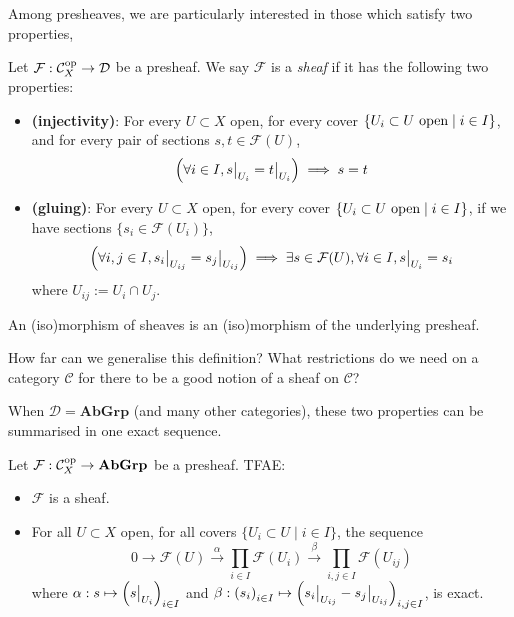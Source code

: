 \documentclass[000-main.tex]{subfiles}
\begin{document}
Among presheaves, we are particularly interested in those which satisfy two properties,
\begin{definition}
  Let $\mathcal{F}: \mathcal{C}_X^{\text{op}}\to \mathcal{D}$ be a presheaf.
  We say $\mathcal{F}$ is a \emph{sheaf} if it has the following two properties:
  \begin{itemize}
    \item \textbf{(injectivity)}: For every $U\subset X$ open, for every cover $\{U_i\subset U\text{ open} \mid i\in I\}$, and for every pair of sections $s, t\in \mathcal{F}(U)$,
          \begin{displaymath}
            \qty(\forall i\in I, {s}{\big|}_{U_i} = {t}{\big|}_{U_i}) \implies s = t
          \end{displaymath}
    \item \textbf{(gluing)}: For every $U\subset X$ open, for every cover $\{U_i\subset U\text{ open}\mid i\in I\}$, if we have sections $\{s_i\in \mathcal{F}(U_i)\}$,
          \begin{displaymath}
            \qty(\forall i, j \in I, {s_i}{\big|}_{U_{ij}} = {s_j}{\big|}_{U_{ij}}) \implies \exists s\in \mathcal{F}(U), \forall i\in I, {s}{\big|}_{U_i} = s_i
          \end{displaymath}
          where $U_{ij} := U_i\cap U_j$.
  \end{itemize}

  An (iso)morphism of sheaves is an (iso)morphism of the underlying presheaf.
\end{definition}
\begin{remark}
  How far can we generalise this definition?
  What restrictions do we need on a category $\mathcal{C}$ for there to be a good notion of a sheaf on $\mathcal{C}$?
\end{remark}

When $\mathcal{D} = \mathbf{AbGrp}$ (and many other categories), these two properties can be summarised in one exact sequence.
\begin{proposition}
  Let $\mathcal{F}: \mathcal{C}_X^{\text{op}} \to \mathbf{AbGrp}$ be a presheaf. TFAE:\@
  \begin{itemize}
    \item $\mathcal{F}$ is a sheaf.
    \item For all $U\subset X$ open, for all covers $\{U_i\subset U\mid i\in I\}$, the sequence
          \begin{displaymath}
            0 \to \mathcal{F}(U) \xrightarrow{\alpha} \prod_{i\in I}\mathcal{F}(U_i) \xrightarrow{\beta} \prod_{i, j\in I}\mathcal{F}(U_{ij})
          \end{displaymath}
          where $\alpha: s\mapsto {\qty({s}{\big|}_{U_i})}_{i\in I}$ and $\beta: {(s_i)}_{i\in I} \mapsto {\qty({s_i}{\big|}_{U_{ij}} - {s_j}{\big|}_{U_{ij}})}_{i, j\in I}$, is exact.
  \end{itemize}
\end{proposition}
\end{document}
